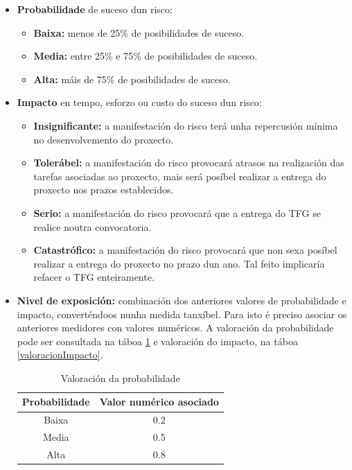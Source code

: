 \begin{itemize}
    \item \textbf{Probabilidade} de suceso dun risco:
    \begin{itemize}
        \item \textbf{Baixa:} menos de 25\% de posibilidades de suceso.
        \item \textbf{Media:} entre 25\% e 75\% de posibilidades de suceso.
        \item \textbf{Alta:} máis de 75\% de posibilidades de suceso.
    \end{itemize}
    
    \item \textbf{Impacto} en tempo, esforzo ou custo do suceso dun risco:
    \begin{itemize}
        \item \textbf{Insignificante:} a manifestación do risco terá unha repercusión mínima no desenvolvemento do proxecto.
        \item \textbf{Tolerábel:} a manifestación do risco provocará atrasos na realización das tarefas asociadas ao proxecto, mais será posíbel realizar a entrega do proxecto nos prazos establecidos.
        \item \textbf{Serio:} a manifestación do risco provocará que a entrega do TFG se realice noutra convocatoria.
        \item \textbf{Catastrófico:} a manifestación do risco provocará que non sexa posíbel realizar a entrega do proxecto no prazo dun ano. Tal feito implicaría refacer o TFG enteiramente.
    \end{itemize}
    
    \item \textbf{Nivel de exposición:} combinación dos anteriores valores de probabilidade e impacto, converténdoos nunha medida tanxíbel. Para isto é preciso asociar os anteriores medidores con valores numéricos. A valoración da probabilidade pode ser consultada na táboa \ref{valoracionProbabilidade} e valoración do impacto, na táboa \ref{valoracionImpacto}.
    
\begin{table}[]
\centering
\caption{Valoración da probabilidade}
\label{valoracionProbabilidade}
\begin{tabular}{|c|c|}
\hline
\textbf{Probabilidade} & \textbf{Valor numérico asociado} \\ \hline
Baixa & 0.2 \\ \hline
Media & 0.5 \\ \hline
Alta & 0.8 \\ \hline
\end{tabular}
\end{table}


\end{itemize}
